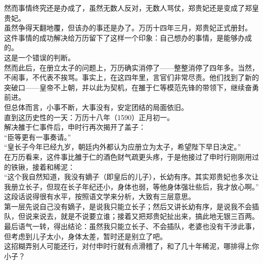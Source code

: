 \begin{multicols}{\theparacolNo}
然而事情终究还是办成了，虽然无数人反对，无数人骂仗，郑贵妃还是变成了郑皇贵妃。\\

虽然争得天翻地覆，但该办的事还是办了。万历十四年三月，郑贵妃正式册封。\\

这件事情的成功解决给万历留下了这样一个印象：自己想办的事情，是能够办成的。\\

这是一个错误的判断。\\

然而此后，在册立太子的问题上，万历确实消停了——整整消停了四年多。当然，不闹事，不代表不挨骂。事实上，在这四年里，言官们非常尽责。他们找到了新的突破口——皇帝不上朝，并以此为契机，在雒于仁等模范先锋的带领下，继续奋勇前进。\\

但总体而言，小事不断，大事没有，安定团结的局面依旧。\\

直到这历史性的一天：万历十八年（1590）正月初一。\\

解决雒于仁事件后，申时行再次揭开了盖子：\\

“臣等更有一事奏请。”\\

“皇长子今年已经九岁，朝廷内外都认为应册立为太子，希望陛下早日决定。”\\

在万历看来，这件事比雒于仁的酒色财气疏更头疼，于是他接过了申时行刚刚用过的铁锹，接着和稀泥：\\

“这个我自然知道，我没有嫡子（即皇后的儿子），长幼有序。其实郑贵妃也多次让我册立长子，但现在长子年纪还小，身体也弱，等他身体强壮些后，我才放心啊。”\\

这段话说得很有水平，按照语文学来分析，大致有三层意思。\\

第一层先说自己没有嫡子，是说我只能立长子；然后又讲长幼有序，是说我不会插队，但说来说去，就是不说要立谁；接着又把郑贵妃扯出来，搞此地无银三百两。\\

最后语气一转，得出结论：虽然我只能立长子、不会插队，老婆也没有干涉此事，但考虑到儿子太小，身体太差，暂时还是别立了吧。\\

这招糊弄别人可能还行，对付申时行就有点滑稽了，和了几十年稀泥，哪排得上你小子？\\


\end{multicols}
